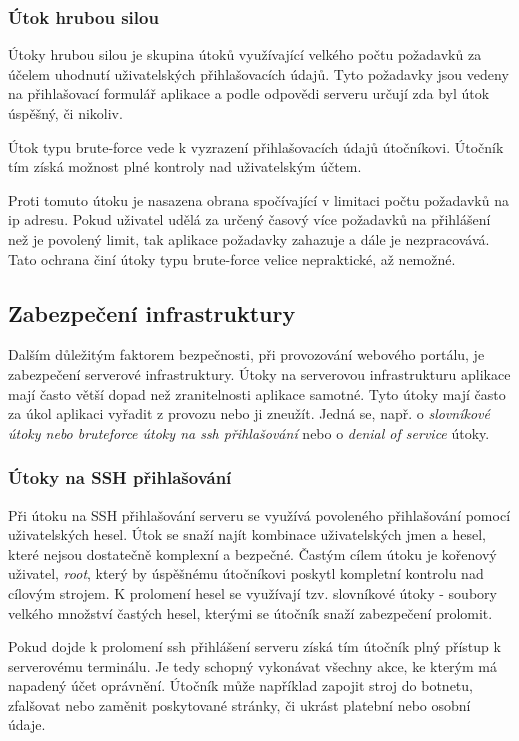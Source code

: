 \subsubsection{Útok hrubou silou}

Útoky hrubou silou\cite{bruteforce} je skupina útoků využívající velkého počtu požadavků za účelem uhodnutí uživatelských přihlašovacích údajů. Tyto požadavky jsou vedeny na přihlašovací formulář aplikace a podle odpovědi serveru určují zda byl útok úspěšný, či nikoliv.

Útok typu brute-force vede k vyzrazení přihlašovacích údajů útočníkovi. Útočník tím získá možnost plné kontroly nad uživatelským účtem.

Proti tomuto útoku je nasazena obrana spočívající v limitaci počtu požadavků na \acrshort{ip} adresu. Pokud uživatel udělá za určený časový více požadavků na přihlášení než je povolený limit, tak aplikace požadavky zahazuje a dále je nezpracovává. Tato ochrana činí útoky typu brute-force velice nepraktické, až nemožné.

\subsection{Zabezpečení infrastruktury}

Dalším důležitým faktorem bezpečnosti, při provozování webového portálu, je zabezpečení serverové infrastruktury. Útoky na serverovou infrastrukturu aplikace mají často větší dopad než zranitelnosti aplikace samotné. Tyto útoky mají často za úkol aplikaci vyřadit z provozu nebo ji zneužít. Jedná se, např. o \emph{slovníkové útoky nebo bruteforce útoky na \acrshort{ssh} přihlašování} nebo o \emph{denial of service} útoky.

\subsubsection{Útoky na SSH přihlašování}

Při útoku na SSH přihlašování serveru se využívá povoleného přihlašování pomocí uživatelských hesel. Útok se snaží najít kombinace uživatelských jmen a hesel, které nejsou dostatečně komplexní a bezpečné. Častým cílem útoku je kořenový uživatel, \emph{root}, který by úspěšnému útočníkovi poskytl kompletní kontrolu nad cílovým strojem. K prolomení hesel se využívají tzv. slovníkové útoky - soubory velkého množství častých hesel, kterými se útočník snaží zabezpečení prolomit.

Pokud dojde k prolomení \acrshort{ssh} přihlášení serveru získá tím útočník plný přístup k serverovému terminálu. Je tedy schopný vykonávat všechny akce, ke kterým má napadený účet oprávnění. Útočník může například zapojit stroj do botnetu\cite{botnet}, zfalšovat nebo zaměnit poskytované stránky, či ukrást platební nebo osobní údaje.

